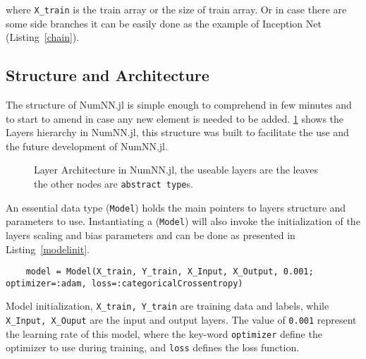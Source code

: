 where \texttt{X_train} is the train array or the size of train array. Or in case there are some side branches it can be easily done as the example of Inception Net \cite{Szegedy2016} (Listing~\ref{chain}). 


\subsection{Structure and Architecture}\label{subsec:saa}

The structure of NumNN.jl is simple enough to comprehend in few minutes and to start to amend in case any new element is needed to be added. \figurename\ref{fig:layerstruct} shows the Layers hierarchy in NumNN.jl, this structure was built to facilitate the use and the future development of NumNN.jl.

\begin{figure}[!ht]
	\centering
		
	\caption{Layer Architecture in NumNN.jl, the useable layers are the leaves the other nodes are \texttt{abstract type}s.}\label{fig:layerstruct}
\end{figure}

An essential data type (\texttt{Model}) holds the main pointers to layers structure and parameters to use. Instantiating a (\texttt{Model}) will also invoke the initialization of the layers scaling and bias parameters and can be done as presented in Listing~\ref{modelinit}.

\begin{listing}[H]
	\begin{verbatim}
	model = Model(X_train, Y_train, X_Input, X_Output, 0.001; optimizer=:adam, loss=:categoricalCrossentropy)
	\end{verbatim}
	\caption{Model initialization, \texttt{X_train, Y_train} are training data and labels, while \texttt{X_Input, X_Ouput} are the input and output layers. The value of \texttt{0.001} represent the learning rate of this model, where the key-word \texttt{optimizer} define the optimizer to use during training, and \texttt{loss} defines the loss function.}\label{modelinit}
\end{listing}

